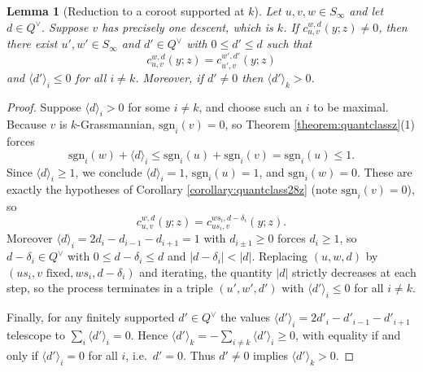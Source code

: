 \documentclass{amsart}
\newtheorem{lemma}{Lemma}[section]
\theoremstyle{definition}
\theoremstyle{remark}
\numberwithin{equation}{section}
\begin{document}
\begin{lemma}[Reduction to a coroot supported at $k$] \label{lemma:offkreduction}
Let $u,v,w\in S_\infty$ and let $d\in Q^\vee$. Suppose $v$ has precisely one descent, which is $k$. If $c_{u,v}^{w,d}(y;z)\neq 0$, then there exist $u',w'\in S_\infty$ and $d'\in Q^\vee$ with $0\leq d'\leq d$ such that
$$c_{u,v}^{w,d}(y;z)=c_{u',v}^{w',d'}(y;z)$$
and $\langle d'\rangle_i\leq 0$ for all $i\neq k$. Moreover, if $d'\neq 0$ then $\langle d'\rangle_k>0$.
\end{lemma}
\begin{proof}
Suppose $\langle d\rangle_i>0$ for some $i\neq k$, and choose such an $i$ to be maximal. Because $v$ is $k$-Grassmannian, $\mathrm{sgn}_i(v)=0$, so Theorem \ref{theorem:quantclassz}(1) forces
$$\mathrm{sgn}_i(w)+\langle d\rangle_i\leq \mathrm{sgn}_i(u)+\mathrm{sgn}_i(v)=\mathrm{sgn}_i(u)\leq 1.$$
Since $\langle d\rangle_i\geq 1$, we conclude $\langle d\rangle_i=1$, $\mathrm{sgn}_i(u)=1$, and $\mathrm{sgn}_i(w)=0$. These are exactly the hypotheses of Corollary \ref{corollary:quantclass28z} (note $\mathrm{sgn}_i(v)=0$), so
$$c_{u,v}^{w,d}(y;z)=c_{us_i,v}^{ws_i,d-\delta_i}(y;z).$$
Moreover $\langle d\rangle_i=2d_i-d_{i-1}-d_{i+1}=1$ with $d_{i\pm 1}\geq 0$ forces $d_i\geq 1$, so $d-\delta_i\in Q^\vee$ with $0\leq d-\delta_i\leq d$ and $|d-\delta_i|<|d|$. Replacing $(u,w,d)$ by $(us_i,v\text{ fixed},ws_i,d-\delta_i)$ and iterating, the quantity $|d|$ strictly decreases at each step, so the process terminates in a triple $(u',w',d')$ with $\langle d'\rangle_i\leq 0$ for all $i\neq k$.

Finally, for any finitely supported $d'\in Q^\vee$ the values $\langle d'\rangle_i=2d'_i-d'_{i-1}-d'_{i+1}$ telescope to $\sum_i\langle d'\rangle_i=0$. Hence $\langle d'\rangle_k=-\sum_{i\neq k}\langle d'\rangle_i\geq 0$, with equality if and only if $\langle d'\rangle_i=0$ for all $i$, i.e.\ $d'=0$. Thus $d'\neq 0$ implies $\langle d'\rangle_k>0$.
\end{proof}

\end{document}
